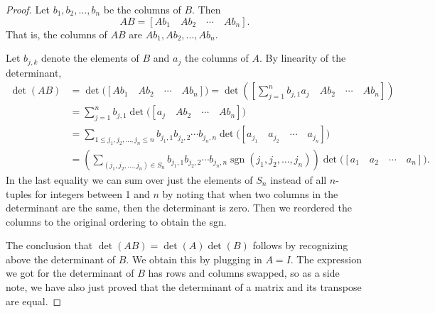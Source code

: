 \begin{proof}
Let $b_1,b_2,\ldots,b_n$ be the columns of $B$.  Then
\begin{equation*}
AB = [ Ab_1 \quad Ab_2 \quad  \cdots \quad  Ab_n ] .
\end{equation*}
That is, the columns of $AB$ are
$Ab_1,Ab_2,\ldots,Ab_n$.

Let $b_{j,k}$ denote the elements of $B$ and
$a_j$ the columns of $A$.
By linearity of the determinant,
\begin{equation*}
\begin{split}
\det(AB) & =  
\det \bigl([ Ab_1 \quad Ab_2 \quad  \cdots \quad  Ab_n ] \bigr) =
\det \left(\left[ \sum_{j=1}^n b_{j,1} a_j \quad Ab_2 \quad  \cdots \quad  Ab_n \right]\right) \\
& =
\sum_{j=1}^n
b_{j,1}
\det \bigl([ a_j \quad Ab_2 \quad  \cdots \quad  Ab_n ]\bigr) \\
& =
\sum_{1 \leq j_1,j_2,\ldots,j_n \leq n}
b_{j_1,1}
b_{j_2,2}
\cdots
b_{j_n,n}
\det \bigl([ a_{j_1} \quad a_{j_2} \quad  \cdots \quad  a_{j_n} ]\bigr) \\
& =
\left(
\sum_{(j_1,j_2,\ldots,j_n) \in S_n}
b_{j_1,1}
b_{j_2,2}
\cdots
b_{j_n,n}
\operatorname{sgn}(j_1,j_2,\ldots,j_n)
\right)
\det \bigl([ a_{1} \quad a_{2} \quad  \cdots \quad  a_{n} ]\bigr) .
\end{split}
\end{equation*}
In the last equality we can sum over just the elements of $S_n$
instead of all $n$-tuples for integers between 1 and $n$
by noting that
when two columns in the determinant are the same, then the
determinant is zero.  Then we reordered the columns to the
original ordering to obtain the sgn.

The conclusion that $\det(AB) = \det(A)\det(B)$
follows by recognizing above the determinant of $B$.  
We obtain this by plugging in $A=I$.
The expression we got for the determinant of $B$ has rows and columns
swapped, so as a side note, we have also just proved that the determinant of
a matrix and its transpose are equal.


\end{proof}
